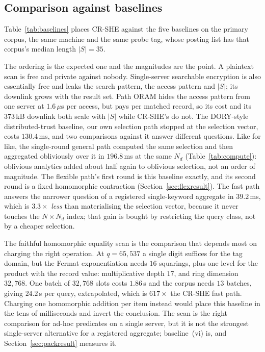 \documentclass[a4paper,fleqn]{cas-sc}
\begin{document}
\subsection{Comparison against baselines}
Table~\ref{tab:baselines} places CR-SHE against the five baselines on the
primary corpus, the same machine and the same probe tag, whose posting list
has that corpus's median length $|S|=35$.

The ordering is the expected one and the magnitudes are the point. A plaintext
scan is free and private against nobody. Single-server searchable encryption
is also essentially free and leaks the search pattern, the access pattern and
$|S|$; its downlink grows with the result set. Path ORAM hides the access
pattern from one server at $1.6\,\mu$s per access, but pays per matched
record, so its cost and its $373$\,kB downlink both scale with $|S|$ while
CR-SHE's do not. The DORY-style distributed-trust baseline, our own selection
path stopped at the selection vector, costs $130.4$\,ms, and two comparisons
against it answer different questions. Like for like, the single-round general
path computed the same selection and then aggregated obliviously over it in
$196.8$\,ms at the same $N_d$ (Table~\ref{tab:compute}): oblivious analytics
added about half again to oblivious selection, not an order of magnitude. The
flexible path's first round is this baseline exactly, and its second round is
a fixed homomorphic contraction (Section~\ref{sec:flexresult}). The
fast path answers the narrower question of a registered single-keyword
aggregate in $39.2$\,ms, which is $3.3\times$ \emph{less} than materialising
the selection vector, because it never touches the $N\times N_d$ index; that
gain is bought by restricting the query class, not by a cheaper selection.

The faithful homomorphic equality scan is the comparison that depends most on
charging the right operation. At $q=65{,}537$ a single digit suffices for the
tag domain, but the Fermat exponentiation needs $16$ squarings, plus one level
for the product with the record value: multiplicative depth $17$, and ring
dimension $32{,}768$. One batch of $32{,}768$ slots costs $1.86$\,s and the
corpus needs $13$ batches, giving $24.2$\,s per query, extrapolated, which is
$617\times$ the CR-SHE fast path. Charging one homomorphic addition per item
instead would place this baseline in the tens of milliseconds and invert the
conclusion. The scan is the right comparison for ad-hoc predicates on a single
server, but it is not the strongest single-server alternative for a registered
aggregate; baseline~(vi) is, and Section~\ref{sec:packresult} measures it.
\end{document}
